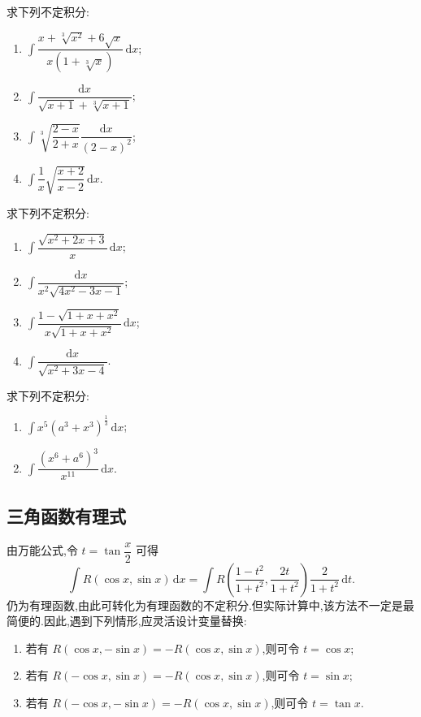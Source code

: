 \documentclass[../数学分析培优讲义.tex]{subfiles}
\begin{document}
\begin{example}
求下列不定积分:
\begin{enumerate}[label=(\arabic*)]
    \item $\displaystyle\int\dfrac{x+\sqrt[3]{x^2}+6\sqrt{x}}{x(1+\sqrt[3]{x})}\,\mathrm{d}x$;
    \item $\displaystyle\int\dfrac{\mathrm{d}x}{\sqrt{x+1}+\sqrt[3]{x+1}}$;
    \item $\displaystyle\int\sqrt[3]{\dfrac{2-x}{2+x}}\dfrac{\mathrm{d}x}{(2-x)^2}$;
    \item $\displaystyle\int\dfrac{1}{x}\sqrt{\dfrac{x+2}{x-2}}\,\mathrm{d}x$.
\end{enumerate}
\end{example}
\exampleblank

\begin{example}
求下列不定积分:
\begin{enumerate}[label=(\arabic*)]
    \item $\displaystyle\int\dfrac{\sqrt{x^2+2x+3}}{x}\,\mathrm{d}x$;
    \item $\displaystyle\int\dfrac{\mathrm{d}x}{x^2\sqrt{4x^2-3x-1}}$;
    \item $\displaystyle\int\dfrac{1-\sqrt{1+x+x^2}}{x\sqrt{1+x+x^2}}\,\mathrm{d}x$;
    \item $\displaystyle\int\dfrac{\mathrm{d}x}{\sqrt{x^2+3x-4}}$.
\end{enumerate}
\end{example}
\exampleblank

\begin{example}
求下列不定积分:
\begin{enumerate}[label=(\arabic*)]
    \item $\displaystyle\int x^5(a^3+x^3)^{\frac{1}{3}}\,\mathrm{d}x$;
    \item $\displaystyle\int\dfrac{(x^6+a^6)^3}{x^{11}}\,\mathrm{d}x$.
\end{enumerate}
\end{example}
\exampleblank


\newpage

\subsection{三角函数有理式}

\begin{proposition}[\markstar]
由万能公式,令 $t=\tan\dfrac{x}{2}$ 可得
\[
    \int R(\cos x,\sin x)\,\mathrm{d}x
    =\int R\left(\dfrac{1-t^2}{1+t^2},\dfrac{2t}{1+t^2}\right)
    \dfrac{2}{1+t^2}\,\mathrm{d}t.
\]
仍为有理函数,由此可转化为有理函数的不定积分.但实际计算中,该方法不一定是最简便的.因此,遇到下列情形,应灵活设计变量替换:
\begin{enumerate}[label=\textcircled{\arabic*}]
    \item 若有 $R(\cos x,-\sin x)=-R(\cos x,\sin x)$,则可令 $t=\cos x$;
    \item 若有 $R(-\cos x,\sin x)=-R(\cos x,\sin x)$,则可令 $t=\sin x$;
    \item 若有 $R(-\cos x,-\sin x)=-R(\cos x,\sin x)$,则可令 $t=\tan x$.
\end{enumerate}
\end{proposition}
\end{document}
